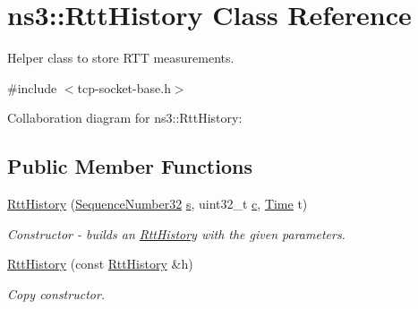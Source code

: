 \hypertarget{classns3_1_1RttHistory}{}\section{ns3\+:\+:Rtt\+History Class Reference}
\label{classns3_1_1RttHistory}


Helper class to store R\+TT measurements.  




{\ttfamily \#include $<$tcp-\/socket-\/base.\+h$>$}



Collaboration diagram for ns3\+:\+:Rtt\+History\+:
\subsection*{Public Member Functions}
\begin{DoxyCompactItemize}
\item 
\hyperlink{classns3_1_1RttHistory_a2fb94771fb13e93a0c3286f4e80155b3}{Rtt\+History} (\hyperlink{group__network_gacb2070e4e98d2d5135c9bede58f07a03}{Sequence\+Number32} \hyperlink{generate__test__data__lte__sinr_8m_ad83eeb3a142285d1243a08c6b7026df8}{s}, uint32\+\_\+t \hyperlink{mmwave_2model_2fading-traces_2fading__trace__generator_8m_ae0323a9039add2978bf5b49550572c7c}{c}, \hyperlink{classns3_1_1Time}{Time} t)
\begin{DoxyCompactList}\small\item\em Constructor -\/ builds an \hyperlink{classns3_1_1RttHistory}{Rtt\+History} with the given parameters. \end{DoxyCompactList}\item 
\hyperlink{classns3_1_1RttHistory_a02495c2240860ae750e0b735125f805f}{Rtt\+History} (const \hyperlink{classns3_1_1RttHistory}{Rtt\+History} \&h)
\begin{DoxyCompactList}\small\item\em Copy constructor. \end{DoxyCompactList}\end{DoxyCompactItemize}

